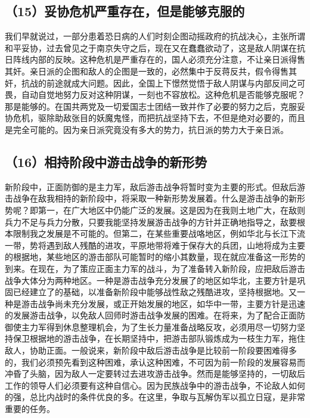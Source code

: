 \subsection{（15）妥协危机严重存在，但是能够克服的}

我们早就说过，一部分患着恐日病的人们时刻企图动摇政府的抗战决心，主张所谓和平妥协，过去曾见之于南京失守之后，现在又在蠢蠢欲动了，这是敌人阴谋在抗日阵线内部的反映。这种危机是严重存在的，国人必须充分注意，不让亲日派得售其奸。亲日派的企图和敌人的企图是一致的，必然集中于反蒋反共，假令得售其奸，抗战的前途就成大问题。因此，全国上下憬然觉悟于敌人阴谋与内部反间之可畏，自动自觉地努力反对这种阴谋，一刻也不容放松。这种危机是否能够克服呢？那是能够的。在国共两党及一切爱国志士团结一致并作了必要的努力之后，克服妥协危机，驱除助敌张目的妖魔鬼怪，而把抗战坚持下去，不但是绝对必要的，而且是完全可能的。因为亲日派究竟没有多大的势力，抗日派的势力大于亲日派。

\subsection{（16）相持阶段中游击战争的新形势}

新阶段中，正面防御的是主力军，敌后游击战争将暂时变为主要的形式。但敌后游击战争在敌我相持的新阶段中，将采取一种新形势发展着。什么是游击战争的新形势呢？即第一，在广大地区中仍能广泛的发展。这是因为在我则土地广大，在敌则兵力不足与兵力分散，只要我能坚持发展游击战争的方针并正确地指导之，敌要根本限制我之发展是不可能的。但第二，在某些重要战咯地区，例如华北与长江下流一带，势将遇到敌人残酷的进攻，平原地带将难于保存大的兵团，山地将成为主要的根据地，某些地区的游击部队可能暂时的缩小其数量，现在就应准备这一形势的到来。在现在，为了策应正面主力军的战斗，为了准备转入新阶段，应把敌后游击战争大体分为两种地区。一种是游击战争充分发展了的地区如华北，主要方针是巩固已经建立了的基础，以准备新阶段中能够战性敌之残酷进攻，坚持根据地。又一种是游击战争尚未充分发展，或正开始发展的地区，如华中一带，主要方针是迅速的发展游击战争，以免敌人回师时游击战争发展的困难。在将来，为了配合正面防御使主力军得到休息整理机会，为了生长力量准备战略反攻，必须用尽一切努力坚持保卫根据地的游击战争，在长期坚持中，把游击部队锻炼成为一枝生力军，拖住敌人，协助正面。一般说来，新阶段中敌后游击战争是比较前一阶段要困难得多的，我们必须预先看到这种困难，承认这种困难，不可因为前一阶段的发展容易而冲昏了头脑，因为敌人一定要转过去进攻游击战争。然而是能够坚持的，一切敌后工作的领导人们必须要有这种自信心。因为民族战争中的游击战争，不论敌人如何的强，总比内战时的条件优良的多。在这里，争取与瓦解伪军以孤立日寇，是非常重要的任务。

